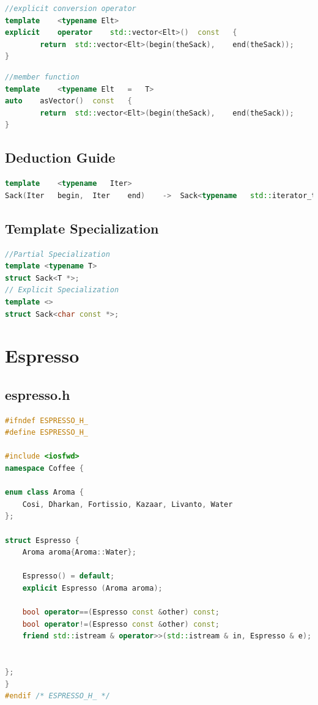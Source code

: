 \begin{lstlisting}[language=C++]
//explicit conversion operator
template	<typename Elt>
explicit	operator	std::vector<Elt>()	const	{
		return	std::vector<Elt>(begin(theSack),	end(theSack));
}
\end{lstlisting}

\begin{lstlisting}[language=C++]
//member function
template	<typename Elt	=	T>
auto	asVector()	const	{
		return	std::vector<Elt>(begin(theSack),	end(theSack));
}
\end{lstlisting}

\subsection{Deduction Guide }

\begin{lstlisting}[language=C++]
template	<typename	Iter>
Sack(Iter	begin,	Iter	end)	->	Sack<typename	std::iterator_traits<Iter>::value_type>;
\end{lstlisting}

\subsection{Template Specialization}
\begin{lstlisting}[language=C++]
//Partial Specialization
template <typename T>
struct Sack<T *>;
// Explicit Specialization
template <>
struct Sack<char const *>;
\end{lstlisting}


\section{Espresso}
\subsection{espresso.h}
\begin{lstlisting}[language=C++]
#ifndef ESPRESSO_H_
#define ESPRESSO_H_

#include <iosfwd>
namespace Coffee {

enum class Aroma {
	Cosi, Dharkan, Fortissio, Kazaar, Livanto, Water
};

struct Espresso {
	Aroma aroma{Aroma::Water};

	Espresso() = default;
	explicit Espresso (Aroma aroma);

	bool operator==(Espresso const &other) const;
	bool operator!=(Espresso const &other) const;
	friend std::istream & operator>>(std::istream & in, Espresso & e);


};
}
#endif /* ESPRESSO_H_ */
\end{lstlisting}
\pagebreak
